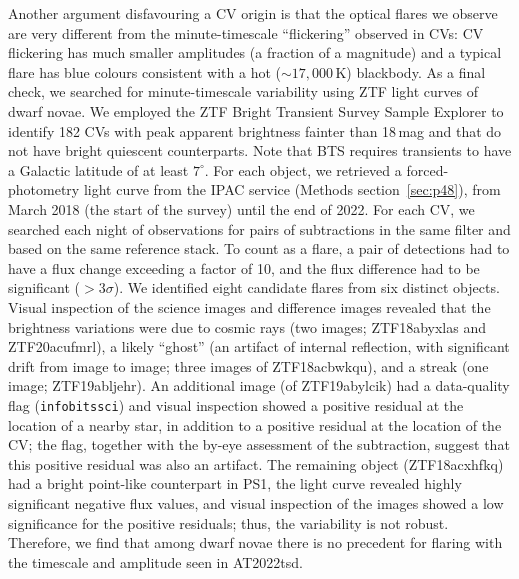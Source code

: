 \documentclass{nature_plusfigure}
\newcommand{\at}{AT2022tsd}
\begin{document}
\begin{methods}
Another argument disfavouring a CV origin is that the optical flares we observe are very different from the minute-timescale ``flickering'' observed in CVs: CV flickering has much smaller amplitudes (a fraction of a magnitude\cite{Bruch2021}) and a typical flare has blue colours consistent with a hot ($\sim17,000\,$K) blackbody\cite{Bruch2021}.
As a final check, we searched for minute-timescale variability using ZTF light curves of dwarf novae. 
We employed the ZTF Bright Transient Survey\cite{FremlingBTS} Sample Explorer\cite{PerleyBTS} to identify 182 CVs with peak apparent brightness fainter than 18\,mag and that do not have bright quiescent counterparts. Note that BTS requires transients to have a Galactic latitude of at least $7^{\circ}$.
For each object, we retrieved a forced-photometry light curve from the IPAC service (Methods section~\ref{sec:p48}), from March 2018 (the start of the survey) until the end of 2022. For each CV, we searched each night of observations for pairs of subtractions in the same filter and based on the same reference stack.
To count as a flare, a pair of detections had to have a flux change exceeding a factor of 10, and the flux difference had to be significant ($>3\sigma$).
We identified eight candidate flares from six distinct objects. Visual inspection of the science images and difference images revealed that the brightness variations were due to cosmic rays (two images; ZTF18abyxlas and ZTF20acufmrl), a likely ``ghost'' (an artifact of internal reflection, with significant drift from image to image; three images of ZTF18acbwkqu), and a streak (one image; ZTF19abljehr). An additional image (of ZTF19abylcik) had a data-quality flag (\texttt{infobitssci}) and visual inspection showed a positive residual at the location of a nearby star, in addition to a positive residual at the location of the CV; the flag, together with the by-eye assessment of the subtraction, suggest that this positive residual was also an artifact. The remaining object (ZTF18acxhfkq) had a bright point-like counterpart in PS1, the light curve revealed highly significant negative flux values, and visual inspection of the images showed a low significance for the positive residuals; thus, the variability is not robust.  
Therefore, we find that among dwarf novae there is no precedent for flaring with the timescale and amplitude seen in \at.


\end{methods}
\end{document}
